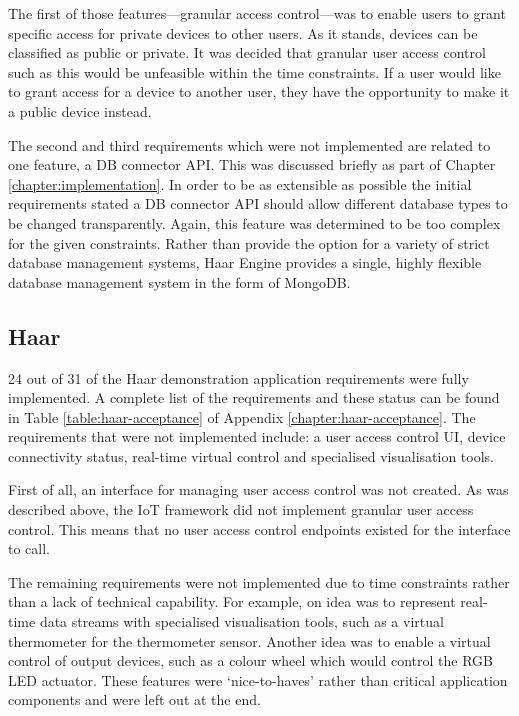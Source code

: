       The first of those features---granular access control---was to enable users to grant specific access for private devices to other users. As it stands, devices can be classified as public or private. It was decided that granular user access control such as this would be unfeasible within the time constraints. If a user would like to grant access for a device to another user, they have the opportunity to make it a public device instead.

      The second and third requirements which were not implemented are related to one feature, a DB connector API. This was discussed briefly as part of Chapter \ref{chapter:implementation}. In order to be as extensible as possible the initial requirements stated a DB connector API should allow different database types to be changed transparently. Again, this feature was determined to be too complex for the given constraints. Rather than provide the option for a variety of strict database management systems, Haar Engine provides a single, highly flexible database management system in the form of MongoDB.

    \subsection{Haar}
      24 out of 31 of the Haar demonstration application requirements were fully implemented. A complete list of the requirements and these status can be found in Table \ref{table:haar-acceptance} of Appendix \ref{chapter:haar-acceptance}. The requirements that were not implemented include: a user access control UI, device connectivity status, real-time virtual control and specialised visualisation tools.

      First of all, an interface for managing user access control was not created. As was described above, the IoT framework did not implement granular user access control. This means that no user access control endpoints existed for the interface to call.

      The remaining requirements were not implemented due to time constraints rather than a lack of technical capability. For example, on idea was to represent real-time data streams with specialised visualisation tools, such as a virtual thermometer for the thermometer sensor. Another idea was to enable a virtual control of output devices, such as a colour wheel which would control the RGB LED actuator. These features were `nice-to-haves' rather than critical application components and were left out at the end.

